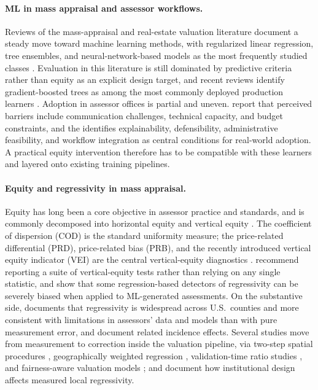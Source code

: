 \documentclass[12pt]{article}
\theoremstyle{plain}
\theoremstyle{definition}
\newcommand{\1}{\mathbf{1}}
\begin{document}
\paragraph{ML in mass appraisal and assessor workflows.}
Reviews of the mass-appraisal and real-estate valuation literature document a steady move toward machine learning methods, with regularized linear regression, tree ensembles, and neural-network-based models as the most frequently studied classes \cite{WangLi2019,Rootetal2023,Sevgen2024100111,Zilli2024,purdueAssessingTechniques}. Evaluation in this literature is still dominated by predictive criteria rather than equity as an explicit design target, and recent reviews identify gradient-boosted trees as among the most commonly deployed production learners \cite{Rootetal2023,Sevgen2024100111,Zilli2024}. Adoption in assessor offices is partial and uneven. \textcite{BidansetRakow2022} report that perceived barriers include communication challenges, technical capacity, and budget constraints, and the \textcite{IAAOAITaskForce2022} identifies explainability, defensibility, administrative feasibility, and workflow integration as central conditions for real-world adoption. A practical equity intervention therefore has to be compatible with these learners and layered onto existing training pipelines.


\paragraph{Equity and regressivity in mass appraisal.}
Equity has long been a core objective in assessor practice and standards, and is commonly decomposed into horizontal equity and vertical equity \cite{IAAO2013Ratio,IAAO2025Mass,10578d49-78f8-3ef9-8277-9b6add2bd071,cornia2006property,McMillenSingh2023}. The coefficient of dispersion (COD) is the standard uniformity measure; the price-related differential (PRD), price-related bias (PRB), and the recently introduced vertical equity indicator (VEI) are the central vertical-equity diagnostics \cite{IAAO2013Ratio,IAAO2025ExposureRatio,IAAO2025Mass}. \textcite{IAAO2023VerticalReview} recommend reporting a suite of vertical-equity tests rather than relying on any single statistic, and \textcite{McMillenSingh2023} show that some regression-based detectors of regressivity can be severely biased when applied to ML-generated assessments. On the substantive side, \textcite{Berry2021} documents that regressivity is widespread across U.S.\ counties and more consistent with limitations in assessors' data and models than with pure measurement error, and \textcite{AvenancioLeonHoward2022} document related incidence effects. Several studies move from measurement to correction inside the valuation pipeline, via two-step spatial procedures \cite{Quintos2014}, geographically weighted regression \cite{BidansetEtAl2019,BidansetEtAl2025}, validation-time ratio studies \cite{HermansEtAl2022,HermansEtAl2025}, and fairness-aware valuation models \cite{CandoganHanLu2023}; \textcite{ScottDaigle2022} and \textcite{Rakow2023,Rakow2024} document how institutional design affects measured local regressivity.
\end{document}
